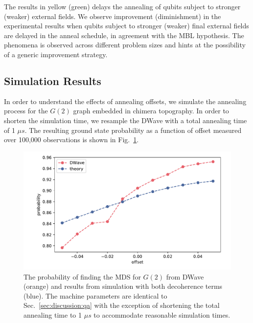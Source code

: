 \documentclass[prd,twocolumn,tightenlines,preprintnumbers,showpacs,superscriptaddress,notitlepage,nofootinbib,eqsecnum,floatfix,longbibliography,aps,10pt]{revtex4-2}
\begin{document}
The results in yellow (green) delays the annealing of qubits subject to stronger (weaker) external fields. We observe improvement (diminishment) in the experimental results when qubits subject to stronger (weaker) final external fields are delayed in the anneal schedule, in agreement with the MBL hypothesis. The phenomena is observed across different problem sizes and hints at the possibility of a generic improvement strategy.


\subsection{Simulation Results}

In order to understand the effects of annealing offsets, we simulate the annealing process for the $G(2)$ graph embedded in chimera topography.
In order to shorten the simulation time, we resample the DWave with a total annealing time of 1 $\mu s$.
The resulting ground state probability as a function of offset measured over 100,000 observations is shown in Fig.~\ref{fig:dwave1us}.

\begin{figure}
	\centering
	\includegraphics[width=\columnwidth]{./new_figures/NN2_offset_scaling.pdf}
	\caption{The probability of finding the MDS for $G(2)$ from DWave (orange) and results from simulation with both decoherence terms (blue).
     The machine parameters are identical to Sec.~\ref{sec:discussion:qa} with the exception of shortening the total annealing time to 1 $\mu s$ to accommodate reasonable simulation times.}
	\label{fig:dwave1us}
\end{figure}
\end{document}
